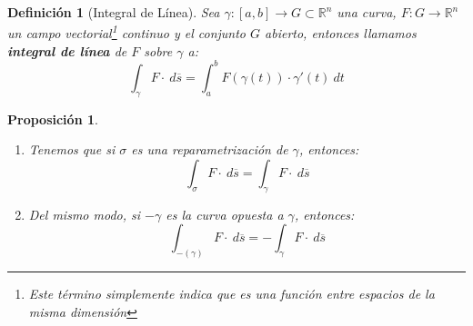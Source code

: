 \documentclass[10pt,a4paper,openright]{book}
\theoremstyle{break}
\newtheorem*{defi}{Definición}
\newtheorem*{prop}{Proposición}
\newcommand{\dif}[1]{\ d#1}
\begin{document}
\begin{defi}[Integral de Línea]
Sea $\gamma: \left[ a, b \right] \rightarrow G \subset \mathbb{R}^n$ una curva, $F: G \rightarrow \mathbb{R}^n$ un campo vectorial\footnote{Este término simplemente indica que es una función entre espacios de la misma dimensión} continuo y el conjunto $G$ abierto, entonces llamamos \textbf{integral de línea} de $F$ sobre $\gamma$ a:
$$\int_{\gamma} F \cdot \dif{\overline{s}} = \int_{a}^{b} F\left( \gamma\left( t \right) \right) \cdot \gamma'\left( t \right) \dif{t}$$
\end{defi}

\begin{prop}
\begin{enumerate}
   	\item Tenemos que si $\sigma$ es una reparametrización de $\gamma$, entonces: 
    $$\int_{\sigma} F \cdot \dif{\overline{s}} = \int_{\gamma} F\cdot \dif{\overline{s}}$$

    \item Del mismo modo, si $-\gamma$ es la curva opuesta a $\gamma$, entonces: 
    $$\int_{-\left( \gamma \right)} F \cdot \dif{\overline{s}} = -\int_{\gamma} F \cdot \dif{\overline{s}}$$
\end{enumerate}
\end{prop}
\end{document}
